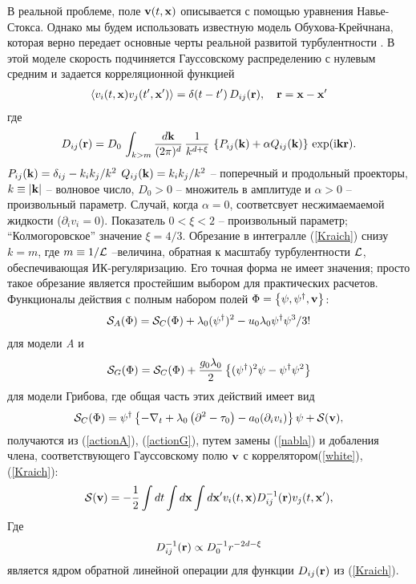 \documentclass[a4paper,10pt]{article}
\def\S{{\cal S}}
\def\bfr{{\bf r}}
\def\bfx{{\bf x}}
\def\bfv{{\bf v}}
\def\S{{\cal S}}
\def\bfr{{\bf r}}
\def\bfx{{\bf x}}
\def\bfv{{\bf v}}
\begin{document}
В реальной проблеме, поле  ${\bf v}(t,{\bf x})$  описывается с помощью уравнения Навье-Стокса. Однако мы будем
 использовать известную модель
Обухова-Крейчнана, которая верно передает основные черты реальной
развитой турбулентности \cite{FGV}. В этой моделе скорость подчиняется Гауссовскому распределению с нулевым средним и задается  корреляционной функцией 
\begin{eqnarray}
\langle v_{i}(t, \bfx) v_{j}(t',{\bf x'})\rangle =  \delta(t-t')\,
D_{ij}(\bfr), \quad \bfr = \bfx-{\bf x'}
\label{white}
\end{eqnarray}
где
\begin{eqnarray}
D_{ij}(\bfr) = D_{0}\, \int_{k>m} \frac{d{\bf k}}{(2\pi)^{d}} \,
\frac{1}{k^{d+\xi}}\, \left\{ P_{ij}({\bf k})+\alpha Q_{ij}({\bf
k}) \right\}\, \exp ({\rm i} {\bf kr} ).
\label{Kraich}
\end{eqnarray}
$P_{ij}({\bf k}) = \delta_{ij} - k_i k_j / k^2$ 
$Q_{ij}({\bf k})=k_i k_j/k^2$ -- поперечный и продольный проекторы, $k\equiv |{\bf k}|$ -- волновое число,
$D_{0}>0$ -- множитель в амплитуде и $\alpha>0$ --произвольный параметр.
Случай, когда $\alpha=0$, соответсвует несжимаемаемой жидкости
($\partial _i v_{i}=0$).
Показатель $0<\xi<2$ -- произвольный параметр; ``Колмогоровское'' значение $\xi=4/3$. Обрезание в интегралле
(\ref{Kraich}) снизу $k=m$, где  $m\equiv 1/{\cal L}$ --величина, обратная к масштабу турбулентности ${\cal L}$, обеспечивающая ИК-регуляризацию.
Его точная форма не имеет значения; просто такое обрезание является простейшим выбором для практических расчетов. 
Функционалы действия с полным набором полей
$\Phi = \left\{ \psi,\psi^{\dag},{\bf v} \right\}$:
\begin{eqnarray}
\S_{A}(\Phi) = \S_{C}(\Phi) + \lambda_{0} (\psi^{\dag})^{2}
- u_{0}\lambda_{0} \psi^{\dag} \psi^{3} /3!
\label{ActionA}
\end{eqnarray}
для модели {\it A} и
\begin{eqnarray}
\S_{G}(\Phi) = \S_{C}(\Phi)
+ \frac{g_{0}\lambda_{0}}{2} \left\{ (\psi^{\dagger})^2\psi -
\psi^{\dagger}\psi^2  \right\}
\label{ActionG}
\end{eqnarray}
для модели Грибова, где общая часть этих действий имеет вид
\begin{eqnarray}
\S_{C}(\Phi) =  \psi^{\dag} \left\{
-\nabla_{t} + \lambda_{0}\left( \partial^{2}- \tau_{0}\right)
- a_{0} (\partial_{i}v_{i}) \right\} \psi +  \S(\bfv),
\label{ActionC}
\end{eqnarray}
получаются из (\ref{actionA}), (\ref{actionG}), путем замены
(\ref{nabla}) и добаления члена, соответствующего Гауссовскому полю $\bfv$ с коррелятором(\ref{white}), (\ref{Kraich}):
\begin{eqnarray}
\S(\bfv) = -\frac{1}{2} \int dt \int d{\bf x} \int d{\bf x'}
v_{i} (t,\bfx) D_{ij}^{-1}(\bfr) v_{j} (t, {\bf x'}),
\label{Sv}
\end{eqnarray}
Где \[ D_{ij}^{-1}(\bfr) \propto D_{0}^{-1} r^{-2d-\xi} \]
 является ядром обратной линейной операции для функции
$D_{ij}(\bfr)$ из (\ref{Kraich}).
\end{document}
